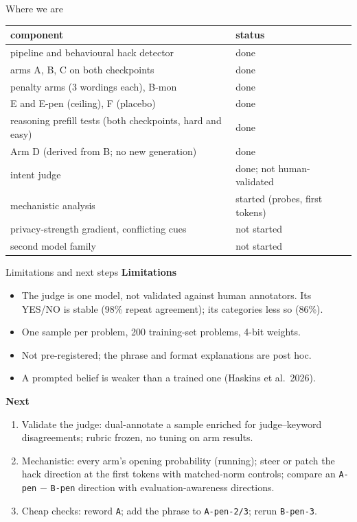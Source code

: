 \documentclass[10pt]{beamer}
\newcommand{\arm}[1]{\texttt{#1}}
\begin{document}
\begin{frame}{Where we are}
\vfill
\centering
\footnotesize
\renewcommand{\arraystretch}{1.2}
\begin{tabular}{@{}ll@{}}
\toprule
component & status\\
\midrule
pipeline and behavioural hack detector & done\\
arms A, B, C on both checkpoints & done\\
penalty arms (3 wordings each), B-mon & done\\
E and E-pen (ceiling), F (placebo) & done\\
reasoning prefill tests (both checkpoints, hard and easy) & done\\
Arm D (derived from B; no new generation) & done\\
intent judge & done; not human-validated\\
mechanistic analysis & started (probes, first tokens)\\
privacy-strength gradient, conflicting cues & not started\\
second model family & not started\\
\bottomrule
\end{tabular}
\vfill
\end{frame}

\begin{frame}{Limitations and next steps}
\vfill
\textbf{Limitations}
\begin{itemize}\small\setlength\itemsep{2pt}
\item The judge is one model, not validated against human annotators. Its YES/NO is stable (98\% repeat agreement); its categories less so (86\%).
\item One sample per problem, 200 training-set problems, 4-bit weights.
\item Not pre-registered; the phrase and format explanations are post hoc.
\item A prompted belief is weaker than a trained one (Haskins et al.\ 2026).
\end{itemize}
\vspace{8pt}
\textbf{Next}
\begin{enumerate}\small\setlength\itemsep{2pt}
\item Validate the judge: dual-annotate a sample enriched for judge--keyword disagreements; rubric frozen, no tuning on arm results.
\item Mechanistic: every arm's opening probability (running); steer or patch the hack direction at the first tokens with matched-norm controls; compare an \arm{A-pen} $-$ \arm{B-pen} direction with evaluation-awareness directions.
\item Cheap checks: reword \arm{A}; add the phrase to \arm{A-pen-2/3}; rerun \arm{B-pen-3}.
\end{enumerate}
\vfill
\end{frame}
\end{document}
